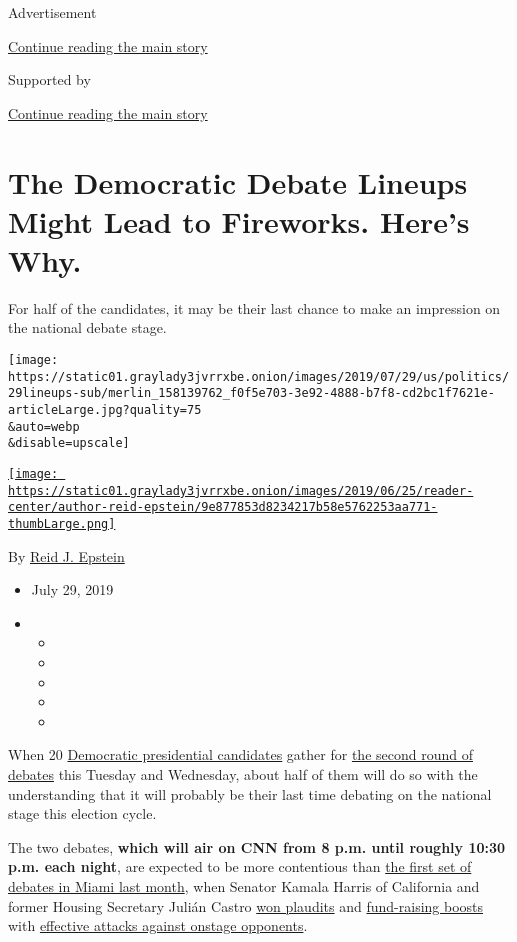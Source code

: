 Advertisement

\protect\hyperlink{after-top}{Continue reading the main story}

Supported by

\protect\hyperlink{after-sponsor}{Continue reading the main story}

\hypertarget{the-democratic-debate-lineups-might-lead-to-fireworks-heres-why}{%
\section{The Democratic Debate Lineups Might Lead to Fireworks. Here's
Why.}\label{the-democratic-debate-lineups-might-lead-to-fireworks-heres-why}}

For half of the candidates, it may be their last chance to make an
impression on the national debate stage.

\texttt{[image: https://static01.graylady3jvrrxbe.onion/images/2019/07/29/us/politics/29lineups-sub/merlin\_158139762\_f0f5e703-3e92-4888-b7f8-cd2bc1f7621e-articleLarge.jpg?quality=75\\\&auto=webp\\\&disable=upscale]}

\href{https://www.nytimes3xbfgragh.onion/by/reid-j-epstein}{\texttt{[image: https://static01.graylady3jvrrxbe.onion/images/2019/06/25/reader-center/author-reid-epstein/9e877853d8234217b58e5762253aa771-thumbLarge.png]}}

By \href{https://www.nytimes3xbfgragh.onion/by/reid-j-epstein}{Reid J.
Epstein}

\begin{itemize}
\item
  July 29, 2019
\item
  \begin{itemize}
  \item
  \item
  \item
  \item
  \item
  \end{itemize}
\end{itemize}

When 20
\href{https://www.nytimes3xbfgragh.onion/news-event/2020-election}{Democratic
presidential candidates} gather for
\href{https://www.nytimes3xbfgragh.onion/news-event/democratic-debates}{the
second round of debates} this Tuesday and Wednesday, about half of them
will do so with the understanding that it will probably be their last
time debating on the national stage this election cycle.

The two debates, \textbf{which will air on CNN from 8 p.m. until roughly
10:30 p.m. each night}, are expected to be more contentious than
\href{https://www.nytimes3xbfgragh.onion/2019/06/28/us/politics/democratic-debates-presidential.html}{the
first set of debates in Miami last month}, when Senator Kamala Harris of
California and former Housing Secretary Julián Castro
\href{https://www.nytimes3xbfgragh.onion/2019/06/27/us/politics/julian-castro-telemundo-debate.html}{won
plaudits} and
\href{https://www.nytimes3xbfgragh.onion/2019/06/29/us/politics/kamala-harris-fundraising-2020.html}{fund-raising
boosts} with
\href{https://www.nytimes3xbfgragh.onion/2019/06/27/us/politics/kamala-harris-busing-joe-biden.html}{effective
attacks against onstage opponents}.

